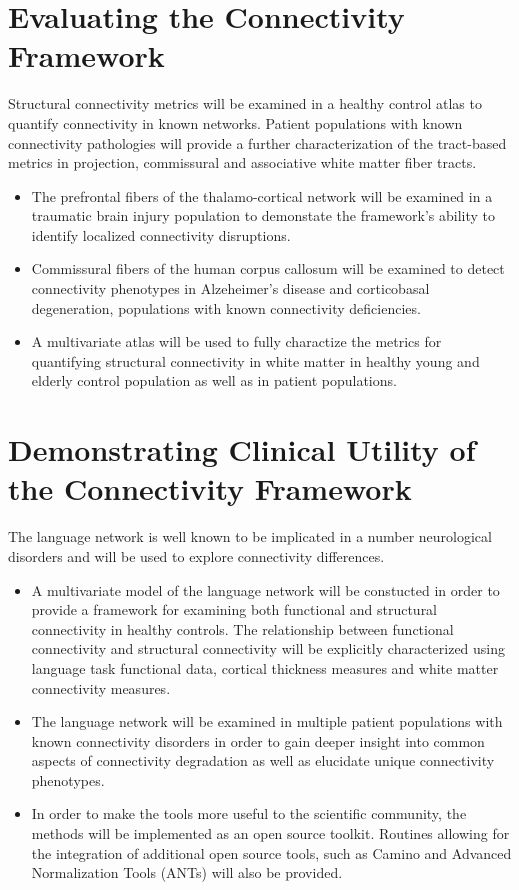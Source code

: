 \section{Evaluating the Connectivity Framework}
Structural connectivity metrics will be examined in a healthy control atlas to quantify connectivity in known networks. Patient populations with known connectivity pathologies will provide a further characterization of the tract-based metrics in projection, commissural and associative white matter fiber tracts.
\begin{itemize}

\item
The prefrontal fibers of the thalamo-cortical network will be examined in a traumatic brain injury population to demonstate the framework's ability to identify localized connectivity disruptions.

\item
Commissural fibers of the human corpus callosum will be examined to detect connectivity phenotypes in Alzeheimer's disease and corticobasal degeneration, populations with known connectivity deficiencies. 

\item
A multivariate atlas will be used to fully charactize the metrics for quantifying structural connectivity in white matter in healthy young and elderly control population as well as in patient populations.

\end{itemize}

\section{Demonstrating Clinical Utility of the Connectivity Framework}
The language network is well known to be implicated in a number neurological disorders and  will be used to explore connectivity differences.

\begin{itemize}

\item
A multivariate model of the language network will be constucted in order to provide a framework for examining both functional and structural connectivity in healthy controls. The relationship between functional connectivity and structural connectivity will be explicitly characterized using language task functional data, cortical thickness measures and white matter connectivity measures.

\item
The language network will be examined in multiple patient populations with known connectivity disorders in order to gain deeper insight into common aspects of connectivity degradation as well as elucidate unique connectivity phenotypes.

\item
In order to make the tools more useful to the scientific community, the methods will be implemented as an open source toolkit. Routines allowing for the integration of additional open source tools, such as Camino and Advanced Normalization Tools (ANTs) will also be provided.

\end{itemize}


